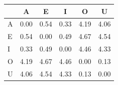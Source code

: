 \begin{tabular}{lccccc}
\toprule
\rowcolor{col01}
 & A & E & I & O & U \\
\midrule
A & 0.00 & 0.54 & 0.33 & 4.19 & 4.06 \\
E & 0.54 & 0.00 & 0.49 & 4.67 & 4.54 \\
I & 0.33 & 0.49 & 0.00 & 4.46 & 4.33 \\
O & 4.19 & 4.67 & 4.46 & 0.00 & 0.13 \\
U & 4.06 & 4.54 & 4.33 & 0.13 & 0.00 \\
\bottomrule
\end{tabular}
